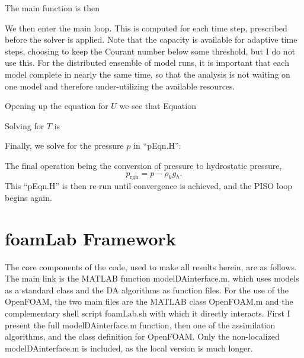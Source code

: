 

The main function is then



We then enter the main loop.
This is computed for each time step, prescribed before the solver is applied.
Note that the capacity is available for adaptive time steps, choosing to keep the Courant number below some threshold, but I do not use this.
For the distributed ensemble of model runs, it is important that each model complete in nearly the same time, so that the analysis is not waiting on one model and therefore under-utilizing the available resources.



Opening up the equation for $U$ we see that Equation



Solving for $T$ is 



Finally, we solve for the pressure $p$ in ``pEqn.H'':



The final operation being the conversion of pressure to hydrostatic pressure,
\begin{equation*} p _\text{rgh} = p - \rho _k g_h . \end{equation*}
This ``pEqn.H'' is then re-run until convergence is achieved, and the PISO loop begins again.



\chapter{foamLab Framework}
\label{app:foamlab}

The core components of the code, used to make all results herein, are as follows.
The main link is the MATLAB function modelDAinterface.m, which uses models as a standard class and the DA algorithms as function files.
For the use of the OpenFOAM, the two main files are the MATLAB class OpenFOAM.m and the complementary shell script foamLab.sh with which it directly interacts.
First I present the full modelDAinterface.m function, then one of the assimilation algorithms, and the class definition for OpenFOAM.
Only the non-localized modelDAinterface.m is included, as the local version is much longer.

